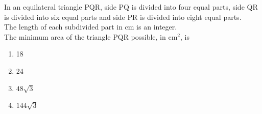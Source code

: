 \item In an equilateral triangle PQR, side PQ is divided into four equal parts, side QR is divided into six equal parts and side PR is divided into eight equal parts.\\
The length of each subdivided part in cm is an integer.\\
The minimum area of the triangle PQR possible, in cm$^2$, is
\begin{multicols}{2}
    \begin{enumerate}
        \item 18
        \item 24
        \item $48 \sqrt{3}$
        \item $144 \sqrt{3}$
    \end{enumerate}
\end{multicols}

